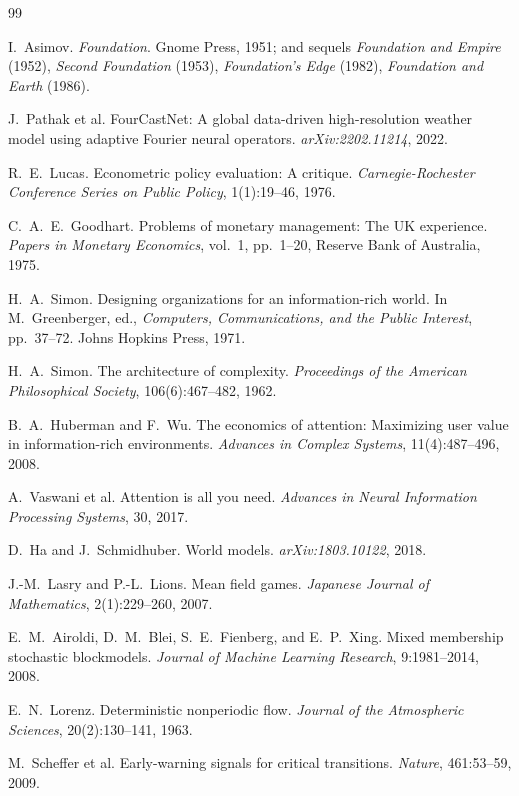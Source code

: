 \documentclass[11pt]{article}
\begin{document}
\begin{thebibliography}{99}\setlength{\itemsep}{1pt}

 I.~Asimov. \emph{Foundation}. Gnome Press, 1951; and sequels \emph{Foundation and Empire} (1952), \emph{Second Foundation} (1953), \emph{Foundation's Edge} (1982), \emph{Foundation and Earth} (1986).

 J.~Pathak et al. FourCastNet: A global data-driven high-resolution weather model using adaptive Fourier neural operators. \emph{arXiv:2202.11214}, 2022.

 R.~E.~Lucas. Econometric policy evaluation: A critique. \emph{Carnegie-Rochester Conference Series on Public Policy}, 1(1):19--46, 1976.

 C.~A.~E.~Goodhart. Problems of monetary management: The UK experience. \emph{Papers in Monetary Economics}, vol.~1, pp.~1--20, Reserve Bank of Australia, 1975.

 H.~A.~Simon. Designing organizations for an information-rich world. In M.~Greenberger, ed., \emph{Computers, Communications, and the Public Interest}, pp.~37--72. Johns Hopkins Press, 1971.

 H.~A.~Simon. The architecture of complexity. \emph{Proceedings of the American Philosophical Society}, 106(6):467--482, 1962.

 B.~A.~Huberman and F.~Wu. The economics of attention: Maximizing user value in information-rich environments. \emph{Advances in Complex Systems}, 11(4):487--496, 2008.

 A.~Vaswani et al. Attention is all you need. \emph{Advances in Neural Information Processing Systems}, 30, 2017.

 D.~Ha and J.~Schmidhuber. World models. \emph{arXiv:1803.10122}, 2018.

 J.-M.~Lasry and P.-L.~Lions. Mean field games. \emph{Japanese Journal of Mathematics}, 2(1):229--260, 2007.

 E.~M.~Airoldi, D.~M.~Blei, S.~E.~Fienberg, and E.~P.~Xing. Mixed membership stochastic blockmodels. \emph{Journal of Machine Learning Research}, 9:1981--2014, 2008.

 E.~N.~Lorenz. Deterministic nonperiodic flow. \emph{Journal of the Atmospheric Sciences}, 20(2):130--141, 1963.

 M.~Scheffer et al. Early-warning signals for critical transitions. \emph{Nature}, 461:53--59, 2009.


\end{thebibliography}
\end{document}
